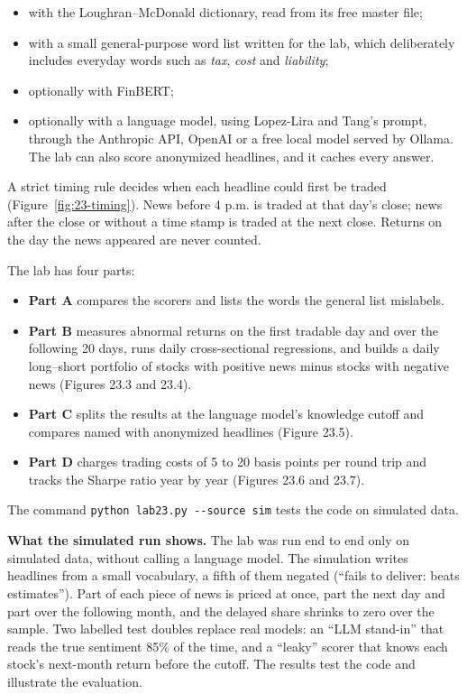 \begin{itemize}
  \item with the Loughran--McDonald dictionary, read from its free master file;
  \item with a small general-purpose word list written for the lab, which deliberately includes everyday words such as \emph{tax}, \emph{cost} and \emph{liability};
  \item optionally with FinBERT;
  \item optionally with a language model, using Lopez-Lira and Tang's prompt, through the Anthropic API, OpenAI or a free local model served by Ollama. The lab can also score anonymized headlines, and it caches every answer.
\end{itemize}

A strict timing rule decides when each headline could first be traded (Figure~\ref{fig:23-timing}). News before 4 p.m. is traded at that day's close; news after the close or without a time stamp is traded at the next close. Returns on the day the news appeared are never counted.

The lab has four parts:

\begin{itemize}
  \item \textbf{Part A} compares the scorers and lists the words the general list mislabels.
  \item \textbf{Part B} measures abnormal returns on the first tradable day and over the following 20 days, runs daily cross-sectional regressions, and builds a daily long--short portfolio of stocks with positive news minus stocks with negative news (Figures 23.3 and 23.4).
  \item \textbf{Part C} splits the results at the language model's knowledge cutoff and compares named with anonymized headlines (Figure 23.5).
  \item \textbf{Part D} charges trading costs of 5 to 20 basis points per round trip and tracks the Sharpe ratio year by year (Figures 23.6 and 23.7).
\end{itemize}

The command \texttt{python lab23.py -{}-source sim} tests the code on simulated data.

\textbf{What the simulated run shows.} The lab was run end to end only on simulated data, without calling a language model. The simulation writes headlines from a small vocabulary, a fifth of them negated (``fails to deliver: beats estimates''). Part of each piece of news is priced at once, part the next day and part over the following month, and the delayed share shrinks to zero over the sample. Two labelled test doubles replace real models: an ``LLM stand-in'' that reads the true sentiment 85\% of the time, and a ``leaky'' scorer that knows each stock's next-month return before the cutoff. The results test the code and illustrate the evaluation.

